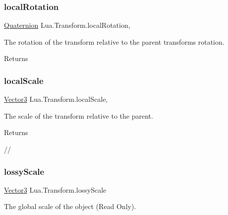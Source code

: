 \subsubsection{\texorpdfstring{localRotation}{localRotation}}
{\footnotesize\ttfamily \mbox{\hyperlink{class_lua_1_1_quaternion}{Quaternion}} Lua.\+Transform.\+local\+Rotation\hspace{0.3cm}{\ttfamily [get]}, {\ttfamily [set]}}



The rotation of the transform relative to the parent transform\textquotesingle{}s rotation. 

\begin{DoxyReturn}{Returns}

\end{DoxyReturn}
\mbox{\label{class_lua_1_1_transform_a40e2891bff5d714d77449aeee6d84492}} 
\subsubsection{\texorpdfstring{localScale}{localScale}}
{\footnotesize\ttfamily \mbox{\hyperlink{class_lua_1_1_vector3}{Vector3}} Lua.\+Transform.\+local\+Scale\hspace{0.3cm}{\ttfamily [get]}, {\ttfamily [set]}}



The scale of the transform relative to the parent. 

\begin{DoxyReturn}{Returns}

\end{DoxyReturn}
// \mbox{\label{class_lua_1_1_transform_a55680638b6e6ae6b1bd4b5095b1822f1}} 
\subsubsection{\texorpdfstring{lossyScale}{lossyScale}}
{\footnotesize\ttfamily \mbox{\hyperlink{class_lua_1_1_vector3}{Vector3}} Lua.\+Transform.\+lossy\+Scale\hspace{0.3cm}{\ttfamily [get]}}



The global scale of the object (Read Only). 

